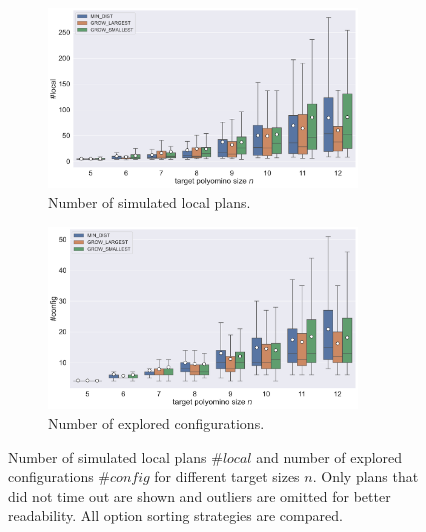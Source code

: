 \begin{figure}
	\centering
	\begin{subfigure}[b]{\textwidth}
		\centering
		\includegraphics[width=0.9\textwidth]{figures/plots/AFN_nlocal.pdf}
		\caption{Number of simulated local plans.}
		\label{fig:AFN_nlocal}
	\end{subfigure}
	
	\begin{subfigure}[b]{\textwidth}
		\centering
		\includegraphics[width=0.9\textwidth]{figures/plots/AFN_nconfig.pdf}
		\caption{Number of explored configurations.}
		\label{fig:AFN_nconfig}
	\end{subfigure}
	\caption[$\#\textit{local}$ and $\#\textit{config}$ for different target sizes]{Number of simulated local plans $\#\textit{local}$ and number of explored configurations $\#\textit{config}$ for different target sizes $n$. Only plans that did not time out are shown and outliers are omitted for better readability. All option sorting strategies are compared.}
	\label{fig:AFN_planstats}
\end{figure}

